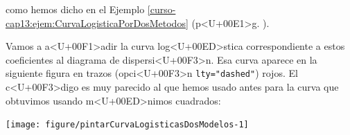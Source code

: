 \documentclass[10pt,a4paper]{article}
\begin{document}
como hemos dicho en el Ejemplo \ref{curso-cap13:ejem:CurvaLogisticaPorDosMetodos} (p<U+00E1>g. \pageref{curso-cap13:ejem:CurvaLogisticaPorDosMetodos}).

Vamos a a<U+00F1>adir la curva log<U+00ED>stica correspondiente a estos coeficientes al diagrama de dispersi<U+00F3>n. Esa curva aparece en la siguiente figura en trazos (opci<U+00F3>n \verb#lty="dashed"#) rojos. El c<U+00F3>digo es muy parecido al que hemos usado antes para la curva que obtuvimos usando m<U+00ED>nimos cuadrados:

\begin{knitrout}
\color{fgcolor}\begin{kframe}
\begin{alltt}
  \hlstd{=} \hlopt{-}\hlstd{,}  \hlstd{=} \hlstd{,}
      \hlstd{=}\hlstd{,} \hlstd{=}\hlstd{,} \hlstd{=}\hlstd{,} \hlstd{=}\hlstd{)}
 \hlkwb{=} \hlstd{(}\hlstd{)\{}
  \hlstd{(} \hlopt{+}  \hlopt{*} \hlopt{/}\hlstd{(} \hlopt{+}  \hlopt{+}  \hlopt{*} 
\hlstd{\}}
  \hlstd{=} \hlopt{-}\hlstd{,}  \hlstd{=} \hlstd{,}
      \hlstd{=}\hlstd{,} \hlstd{=}\hlstd{,} \hlstd{=}\hlstd{,} \hlstd{=}\hlstd{)}
\hlstd{(}\hlstd{=}\hlstd{,} \hlstd{=}\hlstd{(}\hlstd{,} \hlstd{),}
        \hlstd{=} \hlstd{(}\hlstd{,} \hlstd{),} \hlstd{=}\hlstd{,} \hlstd{=}\hlstd{(}\hlstd{,}\hlstd{),}\hlstd{=}\hlstd{,}\hlstd{=}\hlstd{)}
\end{alltt}
\end{kframe}

{\centering \texttt{[image: figure/pintarCurvaLogisticasDosModelos-1]} 

}



\end{knitrout}
\end{document}
